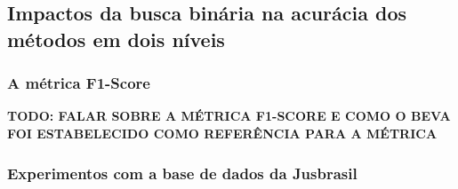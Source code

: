 \subsection{Impactos da busca binária na acurácia dos métodos em dois níveis}



\subsubsection{A métrica F1-Score}

\textbf{TODO: FALAR SOBRE A MÉTRICA F1-SCORE E COMO O BEVA FOI ESTABELECIDO COMO REFERÊNCIA PARA A MÉTRICA}


\subsubsection{Experimentos com a base de dados da Jusbrasil}

